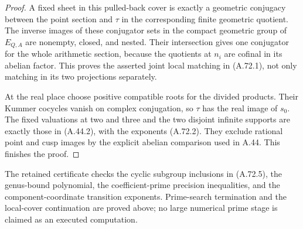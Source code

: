 \begin{proof}
A fixed sheet in this pulled-back cover is exactly a geometric
conjugacy between the point section and $\tau$ in the corresponding
finite geometric quotient.  The inverse images of these conjugator
sets in the compact geometric group of $E_{Q,A}$ are nonempty,
closed, and nested.  Their intersection gives one conjugator for
the whole arithmetic section, because the quotients at $n_i$
are cofinal in its abelian factor.  This proves the asserted
joint local matching in (A.72.1), not only matching in its two
projections separately.

At the real place choose positive compatible roots for the divided
products.  Their Kummer cocycles vanish on complex conjugation,
so $\tau$ has the real image of $s_0$.
The fixed valuations at two and three and the two disjoint infinite
supports are exactly those in (A.44.2), with the exponents (A.72.2).
They exclude rational point and cusp images by the explicit
abelian comparison used in A.44.  This finishes the proof.
\end{proof}

The retained certificate 
checks the cyclic subgroup inclusions in (A.72.5), the genus-bound
polynomial, the coefficient-prime precision inequalities, and the
component-coordinate transition exponents.  Prime-search termination
and the local-cover continuation are proved above; no large numerical
prime stage is claimed as an executed computation.
